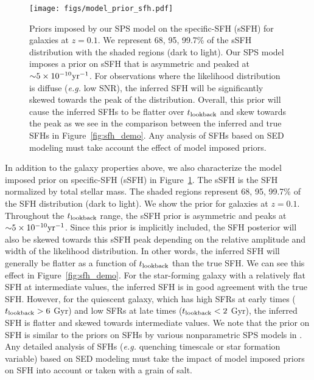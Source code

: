 \begin{figure}
\begin{center}
\texttt{[image: figs/model\_prior\_sfh.pdf]}
    \caption{
        Priors imposed by our SPS model on the specific-SFH (sSFH) for galaxies
        at $z=0.1$. 
        We represent 68, 95, 99.7\% of the sSFH distribution with the shaded
        regions (dark to light). 
        Our SPS model imposes a prior on sSFH that is asymmetric and peaked at 
        ${\sim}5\times10^{-10}{\rm yr}^{-1}$. 
        For observations where the likelihood distribution is diffuse
        (\emph{e.g.} low SNR), the inferred SFH will be significantly skewed
        towards the peak of the distribution. 
        Overall, this prior will cause the inferred SFHs to be flatter over
        $t_{\rm lookback}$ and skew towards the peak as we see in the comparison between
        the inferred and true SFHs in Figure~\ref{fig:sfh_demo}. 
        Any analysis of SFHs based on SED modeling must take account the effect
        of model imposed priors. 
    }\label{fig:sfh_prior}
\end{center}
\end{figure}
In addition to the galaxy properties above, we also characterize the model
imposed prior on specific-SFH (sSFH) in Figure~\ref{fig:sfh_prior}. 
The sSFH is the SFH normalized by total stellar mass. 
The shaded regions represent 68, 95, 99.7\% of the SFH distribution (dark to
light). 
We show the prior for galaxies at $z=0.1$. 
Throughout the $t_{\rm lookback}$ range, the sSFH prior is asymmetric and peaks at
${\sim}5\times10^{-10}{\rm yr}^{-1}$. 
Since this prior is implicitly included, the SFH posterior will also be skewed
towards this sSFH peak depending on the relative amplitude and width of the
likelihood distribution. 
In other words, the inferred SFH will generally be flatter as a function of
$t_{\rm lookback}$ than the true SFH. 
We can see this effect in Figure~\ref{fig:sfh_demo}. 
For the star-forming galaxy with a relatively flat SFH at intermediate values,
the inferred SFH is in good agreement with the true SFH. 
However, for the quiescent galaxy, which has high SFRs at early times ($t_{\rm lookback} >
6$ Gyr) and low SFRs at late times ($t_{\rm lookback} < 2$ Gyr), the inferred SFH is
flatter and skewed towards intermediate values. 
We note that the prior on SFH is similar to the priors on SFHs by various
nonparametric SPS models in \cite{leja2019}. 
Any detailed analysis of SFHs (\emph{e.g.} quenching timescale or star
formation variable) based on SED modeling must take the impact of model
imposed
priors on SFH into account or taken with a grain of salt.  

